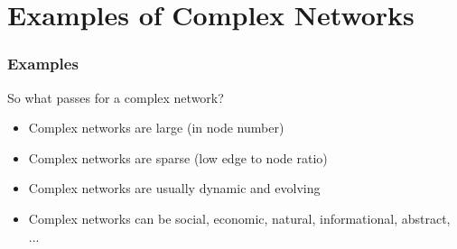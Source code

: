
\section{Examples of Complex Networks}

\begin{frame}
  \frametitle{Examples}

  \begin{block}{So what passes for a complex network?}
    \begin{itemize}
    \item<2-> Complex networks are \alert{large} (in node number)
    \item<3-> Complex networks are \alert{sparse} (low edge to node ratio)
    \item<4-> Complex networks are usually \alert{dynamic} and \alert{evolving}
    \item<5-> Complex networks can be social, economic, natural, informational, abstract, ...
    \end{itemize}
  \end{block}

\end{frame}


